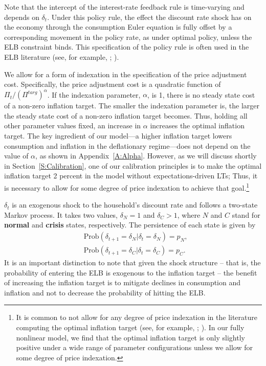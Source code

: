 \documentclass[11pt]{article}
\begin{document}
	Note that the intercept of the interest-rate feedback rule is time-varying and depends on $\delta_{t}$. Under this policy rule, the effect the discount rate shock has on the economy through the consumption Euler equation is fully offset by a corresponding movement in the policy rate, as under optimal policy, unless the ELB constraint binds. This specification of the policy rule is often used in the ELB literature (see, for example, \citet{BonevaBraunWaki2016}; \citet{Eggertsson2011}).

	We allow for a form of indexation in the specification of the price adjustment cost. Specifically, the price adjustment cost is a quadratic function of $\Pi_{t}/(\Pi^{targ})^{\alpha}$. If the indexation parameter, $\alpha$, is 1, there is no steady state cost of a non-zero inflation target. The smaller the indexation parameter is, the larger the steady state cost of a non-zero inflation target becomes. Thus, holding all other parameter values fixed, an increase in $\alpha$ increases the optimal inflation target. The key ingredient of our model---a higher inflation target lowers consumption and inflation in the deflationary regime---does not depend on the value of $\alpha$, as shown in Appendix~\ref{A:Alpha}. However, as we will discuss shortly in Section~\ref{S:Calibration}, one of our calibration principles is to make the optimal inflation target 2 percent in the model without expectations-driven LTs; Thus, it is necessary to allow for some degree of price indexation to achieve that goal.\footnote{It is common to not allow for any degree of price indexation in the literature computing the optimal inflation target (see, for example, \citet{CoibionGorodnichenkoWieland2012};  \citet{AndradeGaliLeBihanMatheron2018}). In our fully nonlinear model, we find that the optimal inflation target is only slightly positive under a wide range of parameter configurations unless we allow for some degree of price indexation.}

	$\delta_{t}$ is an exogenous shock to the household's discount rate and follows a two-state Markov process. It takes two values, $\delta_{N}=1$ and $\delta_{C}>1$, where $N$ and $C$ stand for \textbf{normal} and \textbf{crisis} states, respectively. The persistence of each state is given by
	\begin{align}
		& \text{Prob}(\delta_{t+1}=\delta_{N}|\delta_{t}=\delta_{N})= p_{N},\\
		& \text{Prob}(\delta_{t+1}=\delta_{C}|\delta_{t}=\delta_{C})= p_{C}.
	\end{align}
	It is an important distinction to note that given the  shock structure -- that is, the probability of entering the ELB is exogenous to the inflation target -- the benefit of increasing the inflation target is to mitigate declines in consumption and inflation and not to decrease the probability of hitting the ELB.
\end{document}
